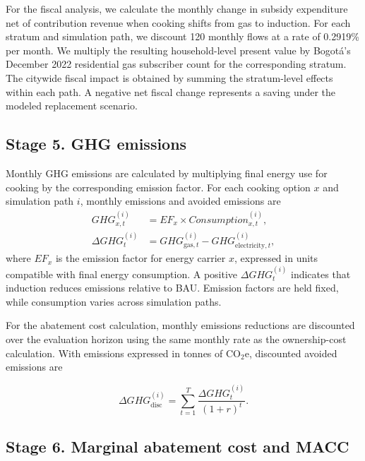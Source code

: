 \documentclass[authoryear,preprint,review,10pt]{elsarticle}
\begin{document}
For the fiscal analysis, we calculate the monthly change in subsidy expenditure net of contribution revenue when cooking shifts from gas to induction. For each stratum and simulation path, we discount 120 monthly flows at a rate of 0.2919\% per month. We multiply the resulting household-level present value by Bogotá's December 2022 residential gas subscriber count for the corresponding stratum. The citywide fiscal impact is obtained by summing the stratum-level effects within each path. A negative net fiscal change represents a saving under the modeled replacement scenario.

\subsection{Stage 5. GHG emissions}
\label{sec:ghg_calculation}

Monthly GHG emissions are calculated by multiplying final energy use for cooking by the corresponding emission factor. For each cooking option $x$ and simulation path $i$, monthly emissions and avoided emissions are
\begin{align}
GHG_{x,t}^{(i)}
    &= EF_x \times Consumption_{x,t}^{(i)}, \\
\Delta GHG_t^{(i)}
    &= GHG_{\text{gas},t}^{(i)}
       - GHG_{\text{electricity},t}^{(i)},
\end{align}
where $EF_x$ is the emission factor for energy carrier $x$, expressed in units compatible with final energy consumption. A positive $\Delta GHG_t^{(i)}$ indicates that induction reduces emissions relative to BAU. Emission factors are held fixed, while consumption varies across simulation paths.

For the abatement cost calculation, monthly emissions reductions are discounted over the evaluation horizon using the same monthly rate as the ownership-cost calculation. With emissions expressed in tonnes of CO$_2$e, discounted avoided emissions are

\begin{equation}
\Delta GHG_{\mathrm{disc}}^{(i)}
    = \sum_{t=1}^{T}
      \frac{\Delta GHG_t^{(i)}}{(1+r)^t}.
\end{equation}

\subsection{Stage 6. Marginal abatement cost and MACC}
\label{sec:mac}
\end{document}
